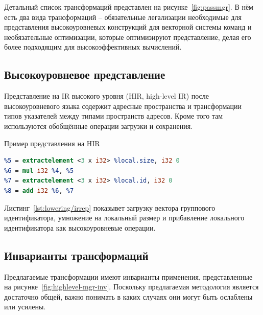 Детальный список трансформаций представлен на рисунке~\cref{fig:passmgr}. В нём есть два вида трансформаций -- обязательные легализации необходимые для представления высокоуровневых конструкций для векторной системы команд и необязательные оптимизации, которые оптимизируют представление, делая его более подходящим для высокоэффективных вычислений.

\subsection{Высокоуровневое представление}\label{subsec:lowering/passes/highlevel}

Представление на IR высокого уровня (HIR, high-level IR) после высокоуровневого языка содержит адресные пространства и трансформации типов указателей между типами пространств адресов. Кроме того там используются обобщённые операции загрузки и сохранения.

\begin{ListingEnv}[!h]
    \captiondelim{ }
    \caption{Пример представления на HIR}\label{lst:lowering/irrep}
    \begin{lstlisting}[language=llvm]
%4 = tail call i32 @llvm.genx.group.id.x()
%5 = extractelement <3 x i32> %local.size, i32 0
%6 = mul i32 %4, %5
%7 = extractelement <3 x i32> %local.id, i32 0
%8 = add i32 %6, %7
    \end{lstlisting}
\end{ListingEnv}

Листинг~\cref{lst:lowering/irrep} показывет загрузку вектора группового идентификатора, умножение на локальный размер и прибавление локального идентификатора как высокоуровневые операции.

\subsection{Инварианты трансформаций}\label{subsec:lowering/passes/invariants}

Предлагаемые трансформации имеют инварианты применения, представленные на рисунке~\cref{fig:highlevel-mgr-inv}. Поскольку предлагаемая методология является достаточно общей, важно понимать в каких случаях они могут быть ослаблены или усилены.

